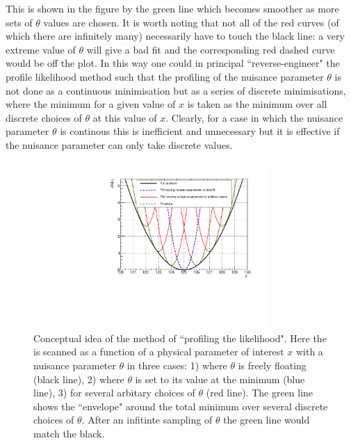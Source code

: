 This is shown in the figure by the green line which becomes smoother as more sets of $\theta$ values are chosen. It is worth noting that not all of the red curves (of which there are infinitely many) necessarily have to touch the black line: a very extreme value of $\theta$ will give a bad fit and the corresponding red dashed curve would be off the plot. In this way one could in principal ``reverse-engineer" the profile likelihood method such that the profiling of the nuisance parameter $\theta$ is not done as a continuous minimisation but as a series of discrete minimisations, where the minimum \NLL for a given value of $x$ is taken as the minimum \NLL over all discrete choices of $\theta$ at this value of $x$. Clearly, for a case in which the nuisance parameter $\theta$ is continous this is inefficient and unnecessary but it is effective if the nuisance parameter can only take discrete values.

\begin{figure}
\begin{center}
  \includegraphics[width=0.8\textwidth]{analysis/plots/envelope_explain.pdf}
  \caption[Conceptual idea of the method of likelihood profiling]{Conceptual idea of the method of ``profiling the likelihood". Here the \NLL is scanned as a function of a physical parameter of interest $x$ with a nuisance parameter $\theta$ in three cases: 1) where $\theta$ is freely floating (black line), 2) where $\theta$ is set to its value at the \NLL minimum (blue line), 3) for several arbitary choices of $\theta$ (red line). The green line shows the ``envelope" around the total minimum over several discrete choices of $\theta$. After an infitinte sampling of $\theta$ the green line would match the black.}
  \label{fig:envelope_explain1}
\end{center}
\end{figure}


